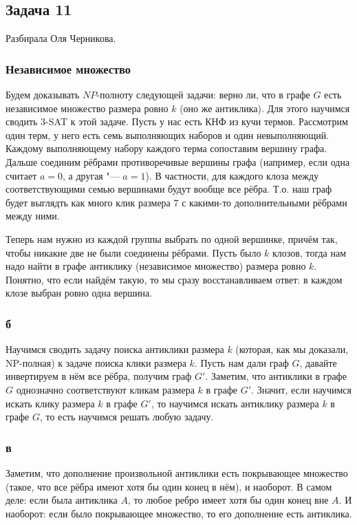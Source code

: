 \subsection{Задача 11}
	Разбирала Оля Черникова.

	\subsubsection{Независимое множество}
		Будем доказывать $NP$-полноту следующей задачи: верно ли, что в графе $G$ есть независимое множество размера ровно $k$ (оно же антиклика).
		Для этого научимся сводить 3-SAT к этой задаче.
		Пусть у нас есть КНФ из кучи термов.
		Рассмотрим один терм, у него есть семь выполняющих наборов и один невыполняющий.
		Каждому выполняющему набору каждого терма сопоставим вершину графа.
		Дальше соединим рёбрами противоречивые вершины графа (например, если одна считает $a=0$, а другая "--- $a=1$).
		В частности, для каждого клоза между соответствующими семью вершинами будут вообще все рёбра.
		Т.о. наш граф будет выглядть как много клик размера 7 с какими-то дополнительными рёбрами между ними.

		Теперь нам нужно из каждой группы выбрать по одной вершинке, причём так, чтобы никакие две не были соединены рёбрами.
		Пусть было $k$ клозов, тогда нам надо найти в графе антиклику (независимое множество) размера ровно $k$.
		Понятно, что если найдём такую, то мы сразу восстанавливаем ответ: в каждом клозе выбран ровно одна вершина.

	\subsubsection{б}
		Научимся сводить задачу поиска антиклики размера $k$ (которая, как мы доказали, NP-полная) к задаче поиска клики размера $k$.
		Пусть нам дали граф $G$, давайте инвертируем в нём все рёбра, получим граф $G'$.
		Заметим, что антиклики в графе $G$ однозначно соответствуют кликам размера $k$ в графе $G'$.
		Значит, если научимся искать клику размера $k$ в графе $G'$, то научимся искать антиклику размера
		$k$ в графе $G$, то есть научимся решать любую задачу.

	\subsubsection{в}
		Заметим, что дополнение произвольной антиклики есть покрывающее множество (такое,
		что все рёбра имеют хотя бы один конец в нём), и наоборот.
		В самом деле: если была антиклика $A$, то любое ребро имеет хотя бы один конец вне $A$.
		И наоборот: если было покрывающее множество, то его дополнение есть антиклика.

